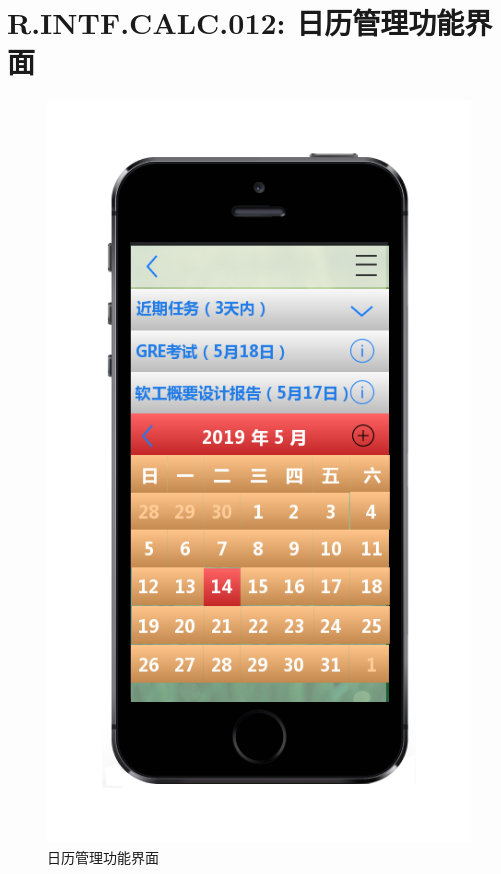     \section{R.INTF.CALC.012: 日历管理功能界面}
    \begin{figure}[h]
        \centering
        \includegraphics[scale=0.6]{OutlineDesign/figures/日历管理功能界面.png}
        \caption{日历管理功能界面}
        \label{fig:server_flow}
    \end{figure}
    \newpage
